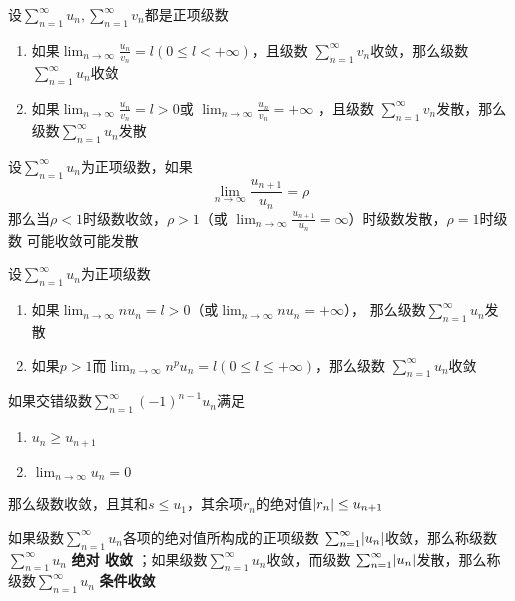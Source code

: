\documentclass[11pt]{article}
\begin{document}
\begin{theorem}[比较审敛法的极限形式]
设\(\sum_{n=1}^\infty u_n,\sum_{n=1}^\infty v_n\)都是正项级数
\begin{enumerate}
\item 如果\(\lim_{n\to\infty}\frac{u_n}{v_n}=l(0\le l<+\infty)\)，且级数
\(\sum_{n=1}^\infty v_n\)收敛，那么级数\(\sum_{n=1}^\infty u_n\)收敛
\item 如果\(\lim_{n\to\infty}\frac{u_n}{v_n}=l>0\)或
\(\lim_{n\to\infty}\frac{u_n}{v_n}=+\infty\)
，且级数
\(\sum_{n=1}^\infty v_n\)发散，那么级数\(\sum_{n=1}^\infty u_n\)发散
\end{enumerate}
\end{theorem}

\begin{theorem}[比值审敛法]
设\(\sum_{n=1}^\infty u_n\)为正项级数，如果
\begin{equation*}
\lim_{n\to\infty}\frac{u_{n+1}}{u_n}=\rho
\end{equation*}
那么当\(\rho<1\)时级数收敛，\(\rho>1\)（或
\(\lim_{n\to\infty}\frac{u_{n+1}}{u_n}=\infty\)）时级数发散，\(\rho=1\)时级数
可能收敛可能发散
\end{theorem}

\begin{theorem}[极限审敛法]
设\(\sum_{n=1}^\infty u_n\)为正项级数
\begin{enumerate}
\item 如果\(\lim_{n\to\infty}nu_n=l>0\)（或\(\lim_{n\to\infty}nu_n=+\infty\)），
那么级数\(\sum_{n=1}^\infty u_n\)发散
\item 如果\(p>1\)而\(\lim_{n\to\infty}n^pu_n=l(0\le l\le+\infty)\)，那么级数
\(\sum_{n=1}^\infty u_n\)收敛
\end{enumerate}
\end{theorem}

\begin{theorem}[莱布尼茨定理]
如果交错级数\(\sum_{n=1}^\infty(-1)^{n-1}u_n\)满足
\begin{enumerate}
\item \(u_n\ge u_{n+1}\)
\item \(\lim_{n\to\infty}u_n=0\)
\end{enumerate}


那么级数收敛，且其和\(s\le u_1\)，其余项\(r_n\)的绝对值\(\abs{r_n}\le u_{n+1}\)
\end{theorem}


如果级数\(\sum_{n=1}^\infty u_n\)各项的绝对值所构成的正项级数
\(\sum_{n=1}^\infty\abs{u_n}\)收敛，那么称级数\(\sum_{n=1}^\infty u_n\) \textbf{绝对
收敛} ；如果级数\(\sum_{n=1}^\infty u_n\)收敛，而级数
\(\sum_{n=1}^\infty\abs{u_n}\)发散，那么称级数\(\sum_{n=1}^\infty u_n\)
\textbf{条件收敛}
\end{document}
